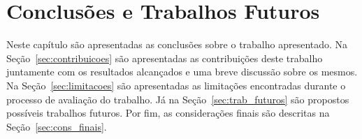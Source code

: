 \chapter{Conclusões e Trabalhos Futuros}\label{chapter:conclusoes_futuros}
Neste capítulo são apresentadas as conclusões sobre o trabalho apresentado. Na Seção~\ref{sec:contribuicoes} são apresentadas as contribuições deste trabalho juntamente com os resultados alcançados e uma breve discussão sobre os mesmos. Na Seção~\ref{sec:limitacoes} são apresentadas as limitações encontradas durante o processo de avaliação do trabalho. Já na Seção~\ref{sec:trab_futuros} são propostos possíveis trabalhos futuros. Por fim, as considerações finais são descritas na Seção~\ref{sec:cons_finais}.






